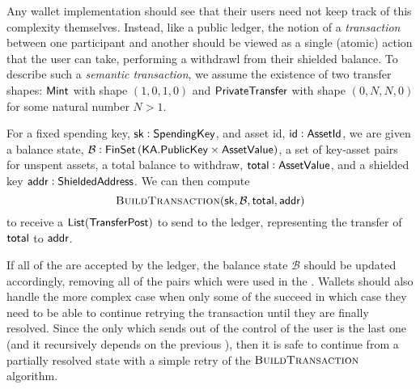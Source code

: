 Any wallet implementation should see that their users need not keep track of this complexity themselves. Instead, like a public ledger, the notion of a \emph{transaction} between one participant and another should be viewed as a single (atomic) action that the user can take, performing a withdrawl from their shielded balance. To describe such a \emph{semantic transaction}, we assume the existence of two transfer shapes\footnotemark{}: ${\textsf{Mint}}$ with shape $(1, 0, 1, 0)$ and ${\textsf{PrivateTransfer}}$ with shape $(0, N, N, 0)$ for some natural number $N > 1$.


For a fixed spending key, ${\textsf{sk}} : {\textsf{SpendingKey}}$, and asset id, ${\textsf{id}} : {\textsf{AssetId}}$, we are given a balance state, $\mathcal{B} : {\textsf{FinSet}}\left({\textsf{KA}}.{\textsf{PublicKey}} \times {\textsf{AssetValue}}\right)$, a set of key-asset pairs for unspent assets, a total balance to withdraw, ${\textsf{total}} : {\textsf{AssetValue}}$, and a shielded key ${\textsf{addr}} : {\textsf{ShieldedAddress}}$. We can then compute 
\[\textsc{BuildTransaction}({\textsf{sk}}, \mathcal{B}, {\textsf{total}}, {\textsf{addr}})\]
to receive a ${\textsf{List}}({\textsf{TransferPost}})$ to send to the ledger, representing the transfer of ${\textsf{total}}$ to ${\textsf{addr}}$.

If all of the  are accepted by the ledger, the balance state $\mathcal{B}$ should be updated accordingly, removing all of the pairs which were used in the \Transfer{}. Wallets should also handle the more complex case when only some of the  succeed in which case they need to be able to continue retrying the transaction until they are finally resolved. Since the only \Transfer{} which sends  out of the control of the user is the last one (and it recursively depends on the previous ), then it is safe to continue from a partially resolved state with a simple retry of the $\textsc{BuildTransaction}$ algorithm.
